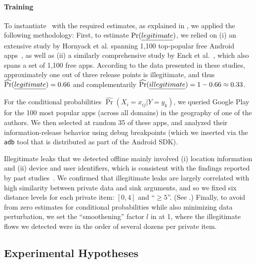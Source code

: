 \paragraph{Training} To instantiate \Tool\ with the required estimates, as explained in , we applied the following methodology:
%
First, to estimate $\Pr(\emph{legitimate})$, we relied on (i) an extensive study by Hornyack et al. spanning 1,100 top-popular free Android apps~\cite{HHJSW:CCS11}, as well as (ii) a similarly comprehensive study by Enck et al.~\cite{EOMC:SEC11}, which also spans a set of 1,100 free apps. According to the data presented in these studies, approximately one out of three release points is illegitimate, and thus $\widehat{\Pr}(\emph{legitimate})=0.66$ and complementarily 
$\widehat{\Pr}(\emph{illegitimate}) = 1-0.66 \approx 0.33$.

For the conditional probabilities $\widehat{\Pr}(X_i = x_{ij} | Y=y_k)$,  we queried Google Play for the 100 most popular apps (across all domains) in the geography of one of the authors. We then selected at random 35 of these apps, and analyzed their information-release behavior using debug breakpoints 
(which we inserted via the {\tt adb} tool that is distributed as part of the Android SDK). 

Illegitimate leaks that we detected offline mainly involved (i) location information and (ii) device and user identifiers, which is consistent with the findings reported by past studies~\cite{HHJSW:CCS11,EOMC:SEC11}. We confirmed that illegitimate leaks are largely correlated with high similarity between private data and sink arguments, and so we fixed six distance levels for each private item: $[0,4]$ and ``$\geq 5$''. (See .) Finally, to avoid from zero estimates for conditional probabilities while also minimizing data perturbation, we set the ``smoothening'' factor $l$ in  at 1, where the illegitimate flows we detected were in the order of several dozens per private item. 

\subsection{Experimental Hypotheses}


